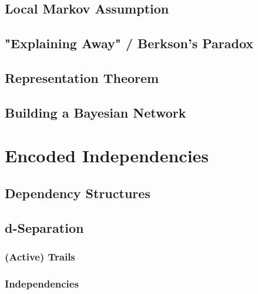         \subsection{Local Markov Assumption} %

        \subsection{"Explaining Away" / Berkson's Paradox} %

        \subsection{Representation Theorem} %

        \subsection{Building a Bayesian Network} %

    \section{Encoded Independencies} %

        \subsection{Dependency Structures} %

        \subsection{d-Separation} %

            \subsubsection{(Active) Trails} %

            \subsubsection{Independencies} %

